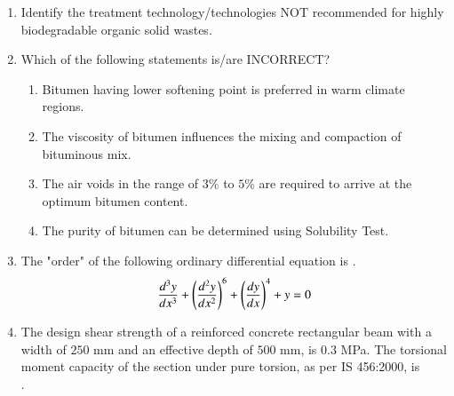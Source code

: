 \documentclass[journal,12pt,onecolumn]{article}
\theoremstyle{remark}
\begin{document}
\begin{enumerate}
    \item Identify the treatment technology/technologies NOT recommended for highly biodegradable organic solid wastes.

    \hfill{}
    \begin{enumerate}
    \end{enumerate}

    \item Which of the following statements is/are INCORRECT?

    \hfill{}
    \begin{enumerate}
        \item Bitumen having lower softening point is preferred in warm climate regions.
        \item The viscosity of bitumen influences the mixing and compaction of bituminous mix.
        \item The air voids in the range of $3$\% to $5$\% are required to arrive at the optimum bitumen content.
        \item The purity of bitumen can be determined using Solubility Test.
    \end{enumerate}

    \item The "order" of the following ordinary differential equation is \underline{\hspace{2cm}}.
    \begin{align} 
    \frac{d^3y}{dx^3} + \left(\frac{d^2y}{dx^2}\right)^6 + \left(\frac{dy}{dx}\right)^4 + y = 0 
    \end{align}
    
    \hfill{}

    \item The design shear strength of a reinforced concrete rectangular beam with a width of $250$ mm and an effective depth of $500$ mm, is $0.3$ MPa. The torsional moment capacity of the section  under pure torsion, as per IS 456:2000, is \underline{\hspace{2cm}} \\ .
    

\end{enumerate}
\end{document}
